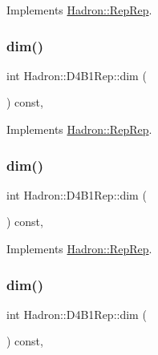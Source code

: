 Implements \mbox{\hyperlink{structHadron_1_1RepRep_a92c8802e5ed7afd7da43ccfd5b7cd92b}{Hadron\+::\+Rep\+Rep}}.

\mbox{\label{structHadron_1_1D4B1Rep_adac801c8769811e585d8c984477629ae}} 
\subsubsection{\texorpdfstring{dim()}{dim()}\hspace{0.1cm}{\footnotesize\ttfamily [3/5]}}
{\footnotesize\ttfamily int Hadron\+::\+D4\+B1\+Rep\+::dim (\begin{DoxyParamCaption}{ }\end{DoxyParamCaption}) const\hspace{0.3cm}{\ttfamily [inline]}, {\ttfamily [virtual]}}



Implements \mbox{\hyperlink{structHadron_1_1RepRep_a92c8802e5ed7afd7da43ccfd5b7cd92b}{Hadron\+::\+Rep\+Rep}}.

\mbox{\label{structHadron_1_1D4B1Rep_adac801c8769811e585d8c984477629ae}} 
\subsubsection{\texorpdfstring{dim()}{dim()}\hspace{0.1cm}{\footnotesize\ttfamily [4/5]}}
{\footnotesize\ttfamily int Hadron\+::\+D4\+B1\+Rep\+::dim (\begin{DoxyParamCaption}{ }\end{DoxyParamCaption}) const\hspace{0.3cm}{\ttfamily [inline]}, {\ttfamily [virtual]}}



Implements \mbox{\hyperlink{structHadron_1_1RepRep_a92c8802e5ed7afd7da43ccfd5b7cd92b}{Hadron\+::\+Rep\+Rep}}.

\mbox{\label{structHadron_1_1D4B1Rep_adac801c8769811e585d8c984477629ae}} 
\subsubsection{\texorpdfstring{dim()}{dim()}\hspace{0.1cm}{\footnotesize\ttfamily [5/5]}}
{\footnotesize\ttfamily int Hadron\+::\+D4\+B1\+Rep\+::dim (\begin{DoxyParamCaption}{ }\end{DoxyParamCaption}) const\hspace{0.3cm}{\ttfamily [inline]}, {\ttfamily [virtual]}}



